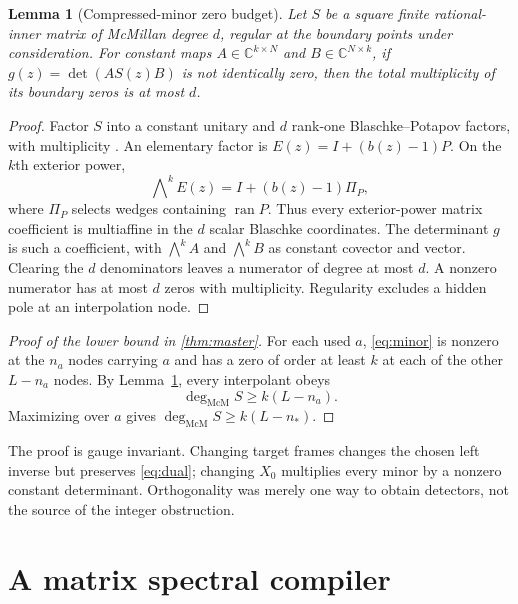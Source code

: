\documentclass[11pt]{article}
\newtheorem{lemma}[theorem]{Lemma}
\theoremstyle{definition}\newtheorem{definition}[theorem]{Definition}\newtheorem{example}[theorem]{Example}
\theoremstyle{remark}\newtheorem{remark}[theorem]{Remark}\newtheorem{limitation}[theorem]{Limitation}
\newcommand{\C}{\mathbb C}\newcommand{\D}{\mathbb D}\newcommand{\T}{\mathbb T}
\newcommand{\ran}{\operatorname{ran}}\newcommand{\Span}{\operatorname{span}}
\newcommand{\mcdeg}{\deg_{\mathrm{McM}}}\newcommand{\A}{\mathcal A}
\begin{document}
\begin{lemma}[Compressed-minor zero budget]\label{lem:budget}
Let $S$ be a square finite rational-inner matrix of McMillan degree $d$,
regular at the boundary points under consideration.  For constant maps
$A\in\C^{k\times N}$ and $B\in\C^{N\times k}$, if
$g(z)=\det(AS(z)B)$ is not identically zero, then the total multiplicity of
its boundary zeros is at most $d$.
\end{lemma}

\begin{proof}
Factor $S$ into a constant unitary and $d$ rank-one
Blaschke--Potapov factors, with multiplicity \cite{Potapov1955}.  An
elementary factor is $E(z)=I+(b(z)-1)P$.  On the $k$th exterior power,
\begin{equation}\label{eq:wedge}
                    \bigwedge\nolimits^kE(z)=I+(b(z)-1)\Pi_P,
\end{equation}
where $\Pi_P$ selects wedges containing $\ran P$.  Thus every exterior-power
matrix coefficient is multiaffine in the $d$ scalar Blaschke coordinates.
The determinant $g$ is such a coefficient, with $\bigwedge^kA$ and
$\bigwedge^kB$ as constant covector and vector.  Clearing the $d$
denominators leaves a numerator of degree at most $d$.  A nonzero numerator
has at most $d$ zeros with multiplicity.  Regularity excludes a hidden pole
at an interpolation node.
\end{proof}

\begin{proof}[Proof of the lower bound in \cref{thm:master}]
For each used $a$, \cref{eq:minor} is nonzero at the $n_a$ nodes carrying
$a$ and has a zero of order at least $k$ at each of the other $L-n_a$
nodes.  By Lemma~\ref{lem:budget}, every interpolant obeys
\begin{equation}\label{eq:all-lower}
                         \mcdeg S\ge k(L-n_a).
\end{equation}
Maximizing over $a$ gives $\mcdeg S\ge k(L-n_*)$.
\end{proof}

The proof is gauge invariant.  Changing target frames changes the chosen
left inverse but preserves \cref{eq:dual}; changing $X_0$ multiplies every
minor by a nonzero constant determinant.  Orthogonality was merely one way
to obtain detectors, not the source of the integer obstruction.

\section{A matrix spectral compiler}
\end{document}
